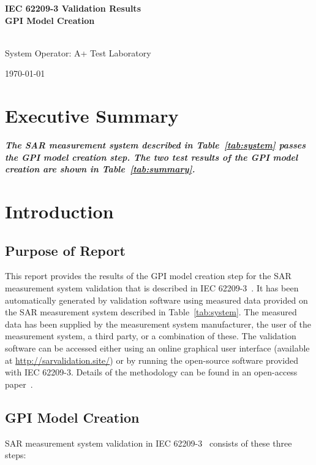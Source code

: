 \documentclass{article}
\begin{document}
\flushright
\begin{Large}
\textbf{IEC 62209-3 Validation Results} \\
\textbf{GPI Model Creation}
\end{Large} \\
System Operator: A+ Test Laboratory \\
\begin{small}
\today \\ \currenttime
\end{small}
\flushleft

\section{Executive Summary}\label{sec:exec_summary}

\textbf{\textit{The SAR measurement system described in Table~\ref{tab:system} passes the GPI model creation step. The two test results of the GPI model creation are shown in Table~\ref{tab:summary}.}}





\section{Introduction}\label{sec:start}

\subsection{Purpose of Report}\label{sec:intro}
This report provides the results of the GPI model creation step for the SAR measurement system validation that is described in IEC 62209-3~\cite{standard}. It has been automatically generated by validation software using measured data provided on the SAR measurement system described in Table~\ref{tab:system}. The measured data has been supplied by the measurement system manufacturer, the user of the measurement system, a third party, or a combination of these. The validation software can be accessed either using an online graphical user interface (available at \url{http://sarvalidation.site/}) or by running the open-source software provided with IEC 62209-3. Details of the methodology can be found in an open-access paper~\cite{gpi-paper}.


\subsection{GPI Model Creation}\label{sec:procedure}
SAR measurement system validation in IEC 62209-3~\cite{standard} consists of these three steps:
\end{document}
